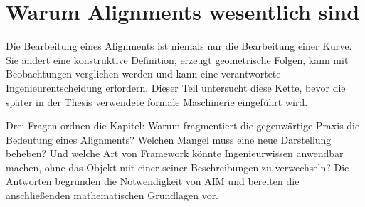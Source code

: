 
\chapter*{Warum Alignments wesentlich sind}
{}

Die Bearbeitung eines Alignments ist niemals nur die Bearbeitung einer Kurve.
Sie ändert eine konstruktive Definition, erzeugt geometrische Folgen, kann mit
Beobachtungen verglichen werden und kann eine verantwortete
Ingenieurentscheidung erfordern. Dieser Teil untersucht diese Kette, bevor die
später in der Thesis verwendete formale Maschinerie eingeführt wird.

Drei Fragen ordnen die Kapitel: Warum fragmentiert die gegenwärtige Praxis die
Bedeutung eines Alignments? Welchen Mangel muss eine neue Darstellung beheben?
Und welche Art von Framework könnte Ingenieurwissen anwendbar machen, ohne das
Objekt mit einer seiner Beschreibungen zu verwechseln? Die Antworten begründen
die Notwendigkeit von AIM und bereiten die anschließenden mathematischen
Grundlagen vor.
